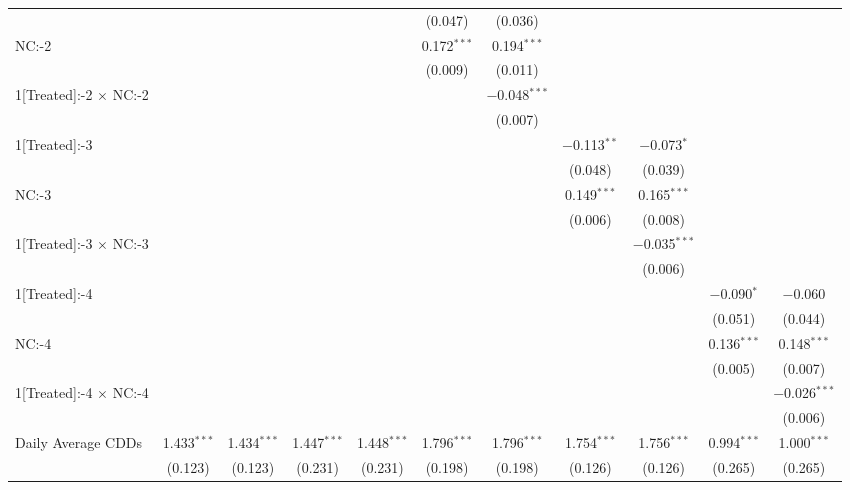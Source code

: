 \begin{table}[!htbp]
\begin{adjustbox}{scale = 0.75}
\begin{tabular}{@{\extracolsep{5pt}}lcccccccccc}
  &  &  &  &  & (0.047) & (0.036) &  &  &  &  \\ 
 NC:-2 &  &  &  &  & 0.172$^{***}$ & 0.194$^{***}$ &  &  &  &  \\ 
  &  &  &  &  & (0.009) & (0.011) &  &  &  &  \\ 
 1[Treated]:-2 $\times$ NC:-2 &  &  &  &  &  & $-$0.048$^{***}$ &  &  &  &  \\ 
  &  &  &  &  &  & (0.007) &  &  &  &  \\ 
 1[Treated]:-3 &  &  &  &  &  &  & $-$0.113$^{**}$ & $-$0.073$^{*}$ &  &  \\ 
  &  &  &  &  &  &  & (0.048) & (0.039) &  &  \\ 
 NC:-3 &  &  &  &  &  &  & 0.149$^{***}$ & 0.165$^{***}$ &  &  \\ 
  &  &  &  &  &  &  & (0.006) & (0.008) &  &  \\ 
 1[Treated]:-3 $\times$ NC:-3 &  &  &  &  &  &  &  & $-$0.035$^{***}$ &  &  \\ 
  &  &  &  &  &  &  &  & (0.006) &  &  \\ 
 1[Treated]:-4 &  &  &  &  &  &  &  &  & $-$0.090$^{*}$ & $-$0.060 \\ 
  &  &  &  &  &  &  &  &  & (0.051) & (0.044) \\ 
 NC:-4 &  &  &  &  &  &  &  &  & 0.136$^{***}$ & 0.148$^{***}$ \\ 
  &  &  &  &  &  &  &  &  & (0.005) & (0.007) \\ 
 1[Treated]:-4 $\times$ NC:-4 &  &  &  &  &  &  &  &  &  & $-$0.026$^{***}$ \\ 
  &  &  &  &  &  &  &  &  &  & (0.006) \\ 
 Daily Average CDDs & 1.433$^{***}$ & 1.434$^{***}$ & 1.447$^{***}$ & 1.448$^{***}$ & 1.796$^{***}$ & 1.796$^{***}$ & 1.754$^{***}$ & 1.756$^{***}$ & 0.994$^{***}$ & 1.000$^{***}$ \\ 
  & (0.123) & (0.123) & (0.231) & (0.231) & (0.198) & (0.198) & (0.126) & (0.126) & (0.265) & (0.265) \\ 

\end{tabular}
\end{adjustbox}
\end{table}
